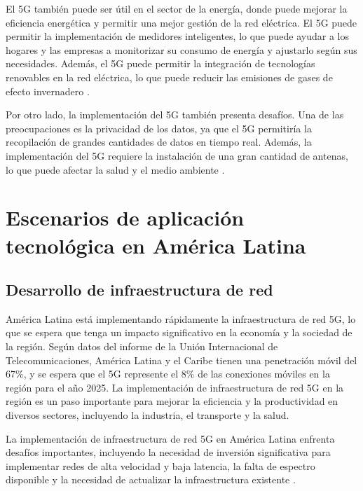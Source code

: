 \documentclass[12pt]{article}
\begin{document}
            El 5G también puede ser útil en el sector de la energía, donde puede mejorar la eficiencia energética y permitir una mejor gestión de la red eléctrica. El 5G puede permitir la implementación de medidores inteligentes, lo que puede ayudar a los hogares y las empresas a monitorizar su consumo de energía y ajustarlo según sus necesidades. Además, el 5G puede permitir la integración de tecnologías renovables en la red eléctrica, lo que puede reducir las emisiones de gases de efecto invernadero \cite{Shah2021}.
            
            Por otro lado, la implementación del 5G también presenta desafíos. Una de las preocupaciones es la privacidad de los datos, ya que el 5G permitiría la recopilación de grandes cantidades de datos en tiempo real. Además, la implementación del 5G requiere la instalación de una gran cantidad de antenas, lo que puede afectar la salud y el medio ambiente \cite{ITU2019}.

    \section{Escenarios de aplicación tecnológica en América Latina}
    
        \subsection{Desarrollo de infraestructura de red}

            América Latina está implementando rápidamente la infraestructura de red 5G, lo que se espera que tenga un impacto significativo en la economía y la sociedad de la región. Según datos del informe de la Unión Internacional de Telecomunicaciones, América Latina y el Caribe tienen una penetración móvil del 67\%, y se espera que el 5G represente el 8\% de las conexiones móviles en la región para el año 2025. La implementación de infraestructura de red 5G en la región es un paso importante para mejorar la eficiencia y la productividad en diversos sectores, incluyendo la industria, el transporte y la salud.
            
            La implementación de infraestructura de red 5G en América Latina enfrenta desafíos importantes, incluyendo la necesidad de inversión significativa para implementar redes de alta velocidad y baja latencia, la falta de espectro disponible y la necesidad de actualizar la infraestructura existente \cite{haro2021perspectivas}.
            
\end{document}
